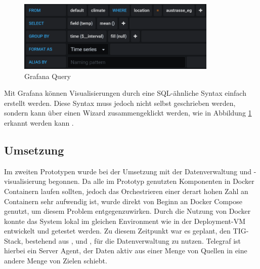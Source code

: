 \begin{figure}[H]
  \vspace{10pt}
  \begin{center}
    \includegraphics[width=0.85\textwidth]{./images/grafana-sql.png}  
    \end{center}
  \vspace{-5pt}
  \caption[Grafana Query]{Grafana Query}
  \label{fig:grafana-sql}
  \vspace{-10pt}
\end{figure}

Mit Grafana können Visualisierungen durch eine SQL-ähnliche Syntax einfach erstellt werden. Diese Syntax muss jedoch nicht selbst geschrieben werden, sondern kann über einen Wizard zusammengeklickt werden, wie in Abbildung \ref{fig:grafana-sql} erkannt werden kann .

\subsection{Umsetzung}
\label{sec:Prot:umsetzung2}

Im zweiten Prototypen wurde bei der Umsetzung mit der Datenverwaltung und \mbox{-visualisierung} begonnen. Da alle im Prototyp genutzten Komponenten in Docker Containern laufen sollten, jedoch das Orchestrieren einer derart hohen Zahl an Containern sehr aufwendig ist, wurde direkt von Beginn an Docker Compose genutzt, um diesem Problem entgegenzuwirken. Durch die Nutzung von Docker konnte das System lokal im gleichen Environment wie in der Deployment-VM entwickelt und getestet werden. Zu diesem Zeitpunkt war es geplant, den TIG-Stack, bestehend aus ,  und , für die Datenverwaltung zu nutzen. Telegraf ist hierbei ein Server Agent, der Daten aktiv aus einer Menge von Quellen in eine andere Menge von Zielen schiebt. 

